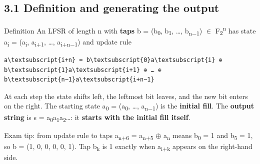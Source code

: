 \documentclass[11pt,a4paper]{article}
\begin{document}
\subsection*{3.1 Definition and generating the output}
\begin{concept}{Definition}
An LFSR of length n with \textbf{taps} b = (b\textsubscript{0}, b\textsubscript{1}, \ldots{}, b\textsubscript{n\ensuremath{-}1}) \ensuremath{\in} F\textsubscript{2}\textsuperscript{n} has state a\textsubscript{i} = (a\textsubscript{i}, a\textsubscript{i+1}, \ldots{}, a\textsubscript{i+n\ensuremath{-}1}) and update rule\par
\begin{workbox}
\begin{Verbatim}[commandchars=\\\{\},fontsize=\footnotesize]
a\textsubscript{i+n} = b\textsubscript{0}a\textsubscript{i} ⊕ b\textsubscript{1}a\textsubscript{i+1} ⊕ … ⊕ b\textsubscript{n−1}a\textsubscript{i+n−1}
\end{Verbatim}
\end{workbox}
At each step the state shifts left, the leftmost bit leaves, and the new bit enters on the right. The starting state a\textsubscript{0} = (a\textsubscript{0}, \ldots{}, a\textsubscript{n\ensuremath{-}1}) is the \textbf{initial fill}. The \textbf{output string} is s = a\textsubscript{0}a\textsubscript{1}a\textsubscript{2}\ldots{}: it \textbf{starts with the initial fill itself}.\par
\end{concept}
\begin{tip}{Exam tip: from update rule to taps}
a\textsubscript{n+6} = a\textsubscript{n+5} \ensuremath{\oplus} a\textsubscript{n} means b\textsubscript{0} = 1 and b\textsubscript{5} = 1, so b = (1, 0, 0, 0, 0, 1). Tap b\textsubscript{k} is 1 exactly when a\textsubscript{i+k} appears on the right-hand side.\par
\end{tip}
\end{document}
